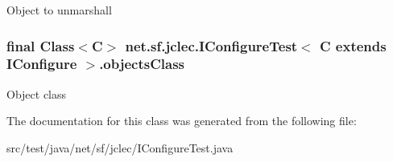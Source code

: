 Object to unmarshall \hypertarget{classnet_1_1sf_1_1jclec_1_1_i_configure_test_3_01_c_01extends_01_i_configure_01_4_a7bcdfe6bb9c3b0379d86b3770482c55d}{
\subsubsection[{objects\-Class}]{\setlength{\rightskip}{0pt plus 5cm}final Class$<$C$>$ net.\-sf.\-jclec.\-I\-Configure\-Test$<$ C extends {\bf I\-Configure} $>$.objects\-Class\hspace{0.3cm}{\ttfamily [protected]}}}\label{classnet_1_1sf_1_1jclec_1_1_i_configure_test_3_01_c_01extends_01_i_configure_01_4_a7bcdfe6bb9c3b0379d86b3770482c55d}
Object class 

The documentation for this class was generated from the following file\-:\begin{DoxyCompactItemize}
\item 
src/test/java/net/sf/jclec/I\-Configure\-Test.\-java\end{DoxyCompactItemize}
